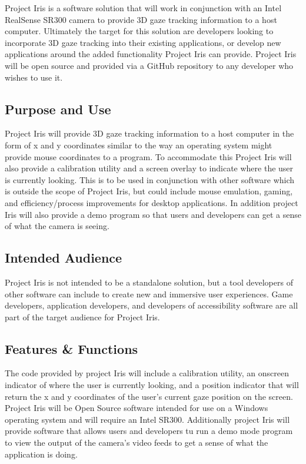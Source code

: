 Project Iris is a software solution that will work in conjunction with an Intel RealSense SR300 camera to provide 3D gaze tracking information to a host computer. Ultimately the target for this solution are developers looking to incorporate 3D gaze tracking into their existing applications, or develop new applications around the added functionality Project Iris can provide. Project Iris will be open source and provided via a GitHub repository to any developer who wishes to use it.

\subsection{Purpose and Use}
Project Iris will provide 3D gaze tracking information to a host computer in the form of x and y coordinates similar to the way an operating system might provide mouse coordinates to a program. To accommodate this Project Iris will also provide a calibration utility and a screen overlay to indicate where the user is currently looking. This is to be used in conjunction with other software which is outside the scope of Project Iris, but could include mouse emulation, gaming, and efficiency/process improvements for desktop applications. In addition project Iris will also provide a demo program so that users and developers can get a sense of what the camera is seeing.

\subsection{Intended Audience}
Project Iris is not intended to be a standalone solution, but a tool developers of other software can include to create new and immersive user experiences. Game developers, application developers, and developers of accessibility software are all part of the target audience for Project Iris.

\subsection{Features \& Functions}
The code provided by project Iris will include a calibration utility, an onscreen indicator of where the user is currently looking, and a position indicator that will return the x and y coordinates of the user's current gaze position on the screen. Project Iris will be Open Source software intended for use on a Windows operating system and will require an Intel SR300. Additionally project Iris will provide software that allows users and developers tu run a demo mode program to view the output of the camera's video feeds to get a sense of what the application is doing. 

